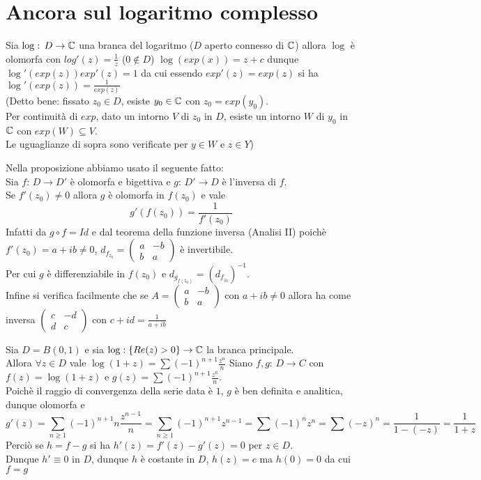 

\section{Ancora sul logaritmo complesso}
\begin{prop}Sia $\log:\, D \to \mathbb{C}$ una branca del logaritmo ($D$ aperto connesso di $\mathbb{C}$) allora $\log$ \`e olomorfa con $log'(z)= \frac{1}{z}$ ($0\not \in D$)
\proof $\log(exp(x))=z+c$ dunque $\log'(exp(z))exp'(z) = 1$ da cui essendo $exp'(z) = exp(z)$ si ha $\log'(exp(z))= \frac{1}{exp(z)}$\\
(Detto bene: fissato $z_0\in D$, esiste $y_0\in\mathbb{C}$ con $z_0=exp(y_0)$.\\
Per continuit\`a di $exp$, dato un intorno $V$ di $z_0$ in $D$, esiste un intorno $W$ di $y_0$ in $\mathbb{C}$  con $exp(W)\subseteq V$.\\
Le uguaglianze di sopra sono verificate per $y\in W$ e $z\in Y$)
\end{prop}
\begin{oss}Nella proposizione abbiamo usato il seguente fatto:\\
Sia $f:\, D \to D'$ \`e olomorfa e bigettiva e $g:\, D'\to D$ \`e l'inversa di $f$.\\
Se $f'(z_0)\neq 0 $ allora $g$ \`e olomorfa in $f(z_0)$ e vale 
$$g'(f(z_0))=\frac{1}{f'(z_0)}$$
Infatti da $g\circ f = Id $ e dal teorema della funzione inversa (Analisi II) poich\`e $f'(z_0) = a+ ib \neq 0 $, 
$d_{f_{z_0}}=\begin{pmatrix}
a & - b \\   b & a
\end{pmatrix}$ \`e invertibile.\\
Per cui $g$ \`e differenziabile in $f(z_0)$ e $d_{g_{f(z_0)}}= (d_{f_{z_0}})^{-1}$.\\
Infine si verifica facilmente che se $A=\begin{pmatrix}
 a & -b \\ b  & a 
\end{pmatrix}$ con $a+ib\neq 0 $ allora ha come inversa $\begin{pmatrix}
c & -d \\ d & c 
\end{pmatrix}$ con $c+id = \frac{1}{a+ib}$
\end{oss}
\spazio
\begin{prop}Sia $D=B(0,1)$ e sia $\log:\{ Re(z)>0\} \to \mathbb{C}$ la branca principale.\\
Allora $\forall z\in D$ vale $\log(1+z) =\sum (-1)^{n+1} \frac{z^n}{n}$
\proof Siano $f,g:\, D \to C$ con $f(z) = \log(1+z)$ e $g(z) =\sum (-1)^{n+1} \frac{z^n}{n}$.\\
Poich\`e il raggio di convergenza della serie data \`e $1$, $g$ \`e ben definita e analitica, dunque olomorfa e 
$$g'(z) = \sum_{n\geq 1}  (-1)^{n+1} n \frac{z^{n-1}}{n} = \sum_{n\geq 1} (-1)^{n+1} z^{n-1} =\sum (-1)^n z^n = \sum (-z)^n = \frac{1}{1-(-z)}=\frac{1}{1+z}$$
Perci\`o se $h=f-g$ si ha $h'(z) = f'(z) - g'(z) = 0$ per $z\in D$.\\
Dunque $h'\equiv 0$ in $D$, dunque $h$ \`e costante in $D$, $h(z)=c$ ma $h(0)=0$ da cui $f=g$
\endproof
\end{prop}
